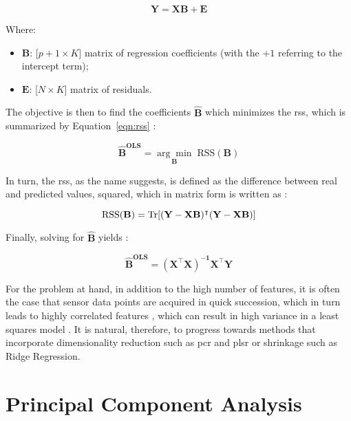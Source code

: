 \begin{equation}
	\label{eqn:ols}
	\mathbf{Y = XB +  E}
\end{equation}

Where:
\begin{itemize}
	\item $\mathbf{B}$: [$p+1 \times K]$ matrix of regression coefficients (with the $+1$ referring to the intercept term);
	\item $\mathbf{E}$: [$N \times K]$ matrix of residuals.
\end{itemize}

The objective is then to find the coefficients $\mathbf{\hat{B}}$ which minimizes the \acrfull{rss}, which is summarized by Equation~\ref{eqn:rss} \parencite{friedman2001}:

\begin{equation}
	\label{eqn:betahat}
	\mathbf{\hat{B}^\text{OLS}} = \underset{\mathbf{B}}{\arg\min} 	\; \text{RSS}(\mathbf{B})
\end{equation}

In turn, the \acrshort{rss}, as the name suggests, is defined as the difference between real and predicted values, squared, which in matrix form is written as \parencite{friedman2001}:

\begin{equation} 
	\label{eqn:rss}
	\text{RSS}(\mathbf{B}) = \operatorname{Tr} [\mathbf{(Y-XB)^\intercal (Y-XB)}]
\end{equation}

Finally, solving for $\mathbf{\hat{B}}$ yields \parencite{friedman2001}:

\begin{equation}
	\label{eqn:ols_beta}
	\mathbf{\hat{B}^\text{OLS}} = \mathbf{(X^\intercal X)^{-1} X^\intercal Y}
\end{equation}

For the problem at hand, in addition to the high number of features, it is often the case that sensor data points are acquired in quick succession, which in turn leads to highly correlated features \parencite{Bastuck_2019}, which can result in high variance in a least squares model \parencite{friedman2001}. It is natural, therefore, to progress towards methods that incorporate dimensionality reduction such as \acrfull{pcr} and \acrfull{plsr} or shrinkage such as Ridge Regression.

\section{Principal Component Analysis}
\label{sec:pca}

